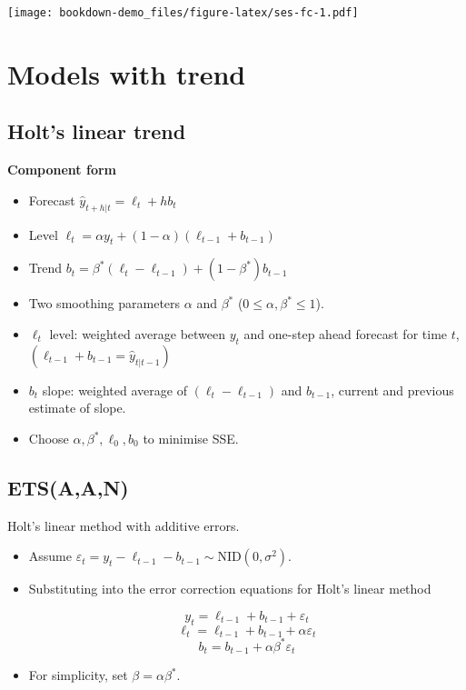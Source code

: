\documentclass[]{book}
\begin{document}
\texttt{[image: bookdown-demo\_files/figure-latex/ses-fc-1.pdf]}

\hypertarget{models-with-trend}{%
\section{Models with trend}\label{models-with-trend}}

\hypertarget{holts-linear-trend}{%
\subsection{Holt's linear trend}\label{holts-linear-trend}}

\textbf{Component form}

\begin{itemize}
\item
  Forecast \(\hat{y}_{t+h|t} = \ell_{t} + hb_{t}\)
\item
  Level \(\ell_{t} = \alpha y_{t} + (1 - \alpha)(\ell_{t-1} + b_{t-1})\)
\item
  Trend \(b_{t} = \beta^*(\ell_{t} - \ell_{t-1}) + (1 -\beta^*)b_{t-1}\)
\item
  Two smoothing parameters \(\alpha\) and \(\beta^*\) (\(0\le\alpha,\beta^*\le1\)).
\item
  \(\ell_t\) level: weighted average between \(y_t\) and one-step ahead forecast for time \(t\), \((\ell_{t-1} + b_{t-1}=\hat{y}_{t|t-1})\)
\item
  \(b_t\) slope: weighted average of \((\ell_{t} - \ell_{t-1})\) and \(b_{t-1}\), current and previous estimate of slope.
\item
  Choose \(\alpha, \beta^*, \ell_0, b_0\) to minimise SSE.
\end{itemize}

\hypertarget{etsaan}{%
\subsection{ETS(A,A,N)}\label{etsaan}}

Holt's linear method with additive errors.

\begin{itemize}
\item
  Assume \(\varepsilon_t=y_t-\ell_{t-1}-b_{t-1} \sim\text{NID}(0,\sigma^2)\).
\item
  Substituting into the error correction equations for Holt's linear method

  \[y_t=\ell_{t-1}+b_{t-1}+\varepsilon_t\]
  \[\ell_t=\ell_{t-1}+b_{t-1}+\alpha \varepsilon_t\]
  \[b_t=b_{t-1}+\alpha\beta^* \varepsilon_t\]
\item
  For simplicity, set \(\beta=\alpha \beta^*\).
\end{itemize}
\end{document}
